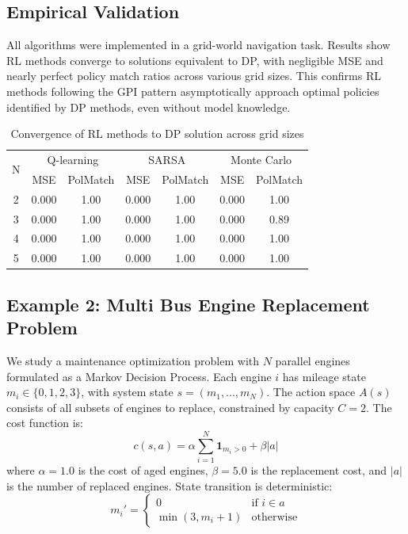\subsection{Empirical Validation}

All algorithms were implemented in a grid-world navigation task. Results show RL methods converge to solutions equivalent to DP, with negligible MSE and nearly perfect policy match ratios across various grid sizes. This confirms RL methods following the GPI pattern asymptotically approach optimal policies identified by DP methods, even without model knowledge.

\begin{table}[h]
\centering
\caption{Convergence of RL methods to DP solution across grid sizes}
\label{tab:results}
\begin{tabular}{c|cc|cc|cc}
\hline
\multirow{2}{*}{N} & \multicolumn{2}{c|}{Q-learning} & \multicolumn{2}{c|}{SARSA} & \multicolumn{2}{c}{Monte Carlo} \\
 & MSE & PolMatch & MSE & PolMatch & MSE & PolMatch \\
\hline
2 & 0.000 & 1.00 & 0.000 & 1.00 & 0.000 & 1.00 \\
3 & 0.000 & 1.00 & 0.000 & 1.00 & 0.000 & 0.89 \\
4 & 0.000 & 1.00 & 0.000 & 1.00 & 0.000 & 1.00 \\
5 & 0.000 & 1.00 & 0.000 & 1.00 & 0.000 & 1.00 \\
\hline
\end{tabular}
\end{table}

\subsection{Example 2: Multi Bus Engine Replacement Problem}

We study a maintenance optimization problem with $N$ parallel engines formulated as a Markov Decision Process. Each engine $i$ has mileage state $m_i \in \{0,1,2,3\}$, with system state $s = (m_1,...,m_N)$. The action space $A(s)$ consists of all subsets of engines to replace, constrained by capacity $C=2$. The cost function is:
\begin{equation}
c(s,a) = \alpha \sum_{i=1}^{N} \mathbf{1}_{m_i > 0} + \beta |a|
\end{equation}
where $\alpha=1.0$ is the cost of aged engines, $\beta=5.0$ is the replacement cost, and $|a|$ is the number of replaced engines. State transition is deterministic:
\begin{equation}
m_i' = 
\begin{cases} 
0 & \text{if } i \in a \\ 
\min(3, m_i+1) & \text{otherwise}
\end{cases}
\end{equation}

